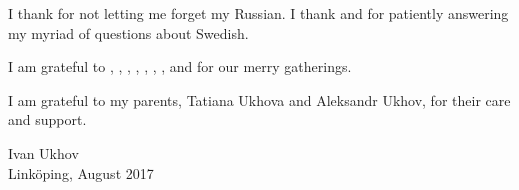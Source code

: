 I thank  for not letting me forget my Russian. I
thank  and  for patiently answering
my myriad of questions about Swedish.

I am grateful to , ,
, , ,
, , and
 for our merry gatherings.

I am grateful to my parents, Tatiana Ukhova and Aleksandr Ukhov, for their care
and support.

\vspace{4em}
\hfill
\begin{minipage}{0.35\textwidth}
Ivan Ukhov\\
Linköping, August 2017
\end{minipage}

